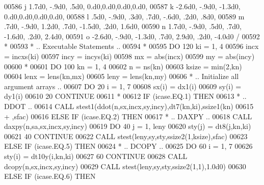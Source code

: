 \begin{DoxyCode}
00586      j           1.7d0,  -.9d0,   .5d0,             0.d0,0.d0,0.d0,0.d0,
00587      k          -2.6d0,  -.9d0, -1.3d0,             0.d0,0.d0,0.d0,0.d0,
00588      l            .5d0,  -.9d0,   .3d0,   .7d0,  -.6d0,   .2d0,   .8d0,
00589      m            .7d0,  -.9d0,  1.2d0,   .7d0, -1.5d0,   .2d0,  1.6d0,
00590      n           1.7d0,  -.9d0,   .5d0,   .7d0, -1.6d0,   .2d0,  2.4d0,
00591      o          -2.6d0,  -.9d0, -1.3d0,   .7d0,  2.9d0,   .2d0, -4.0d0 /
00592 \textcolor{comment}{*    }
00593 \textcolor{comment}{*     .. Executable Statements ..}
00594 \textcolor{comment}{*}
00595       \textcolor{keywordflow}{DO} 120 ki = 1, 4
00596          incx = incxs(ki)
00597          incy = incys(ki)
00598          mx = abs(incx)
00599          my = abs(incy)
00600 \textcolor{comment}{*}
00601          \textcolor{keywordflow}{DO} 100 kn = 1, 4
00602             n = ns(kn)
00603             ksize = min(2,kn)
00604             lenx = lens(kn,mx)
00605             leny = lens(kn,my)
00606 \textcolor{comment}{*           .. Initialize all argument arrays ..}
00607             \textcolor{keywordflow}{DO} 20 i = 1, 7
00608                sx(i) = dx1(i)
00609                sy(i) = dy1(i)
00610    20       \textcolor{keywordflow}{CONTINUE}
00611 \textcolor{comment}{*}
00612             \textcolor{keywordflow}{IF} (icase.EQ.1) \textcolor{keywordflow}{THEN}
00613 \textcolor{comment}{*              .. DDOT ..}
00614                \textcolor{keyword}{CALL }stest1(ddot(n,sx,incx,sy,incy),dt7(kn,ki),ssize1(kn)
00615      +                     ,sfac)
00616             \textcolor{keywordflow}{ELSE} \textcolor{keywordflow}{IF} (icase.EQ.2) \textcolor{keywordflow}{THEN}
00617 \textcolor{comment}{*              .. DAXPY ..}
00618                \textcolor{keyword}{CALL }daxpy(n,sa,sx,incx,sy,incy)
00619                \textcolor{keywordflow}{DO} 40 j = 1, leny
00620                   sty(j) = dt8(j,kn,ki)
00621    40          \textcolor{keywordflow}{CONTINUE}
00622                \textcolor{keyword}{CALL }stest(leny,sy,sty,ssize2(1,ksize),sfac)
00623             \textcolor{keywordflow}{ELSE} \textcolor{keywordflow}{IF} (icase.EQ.5) \textcolor{keywordflow}{THEN}
00624 \textcolor{comment}{*              .. DCOPY ..}
00625                \textcolor{keywordflow}{DO} 60 i = 1, 7
00626                   sty(i) = dt10y(i,kn,ki)
00627    60          \textcolor{keywordflow}{CONTINUE}
00628                \textcolor{keyword}{CALL }dcopy(n,sx,incx,sy,incy)
00629                \textcolor{keyword}{CALL }stest(leny,sy,sty,ssize2(1,1),1.0d0)
00630             \textcolor{keywordflow}{ELSE} \textcolor{keywordflow}{IF} (icase.EQ.6) \textcolor{keywordflow}{THEN}

\end{DoxyCode}
